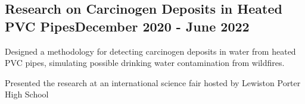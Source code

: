 \documentclass[a4paper, 12pt]{article}
\begin{document}
\vspace*{10pt}
\subsection {{Research on Carcinogen Deposits in Heated PVC Pipes}\hfill December 2020 - June 2022}
\begin{zitemize}
\item Designed a methodology for detecting carcinogen deposits in water from heated PVC pipes, simulating possible drinking water contamination from wildfires.  
\item Presented the research at an international science fair hosted by Lewiston Porter High School 
\end{zitemize}
\end{document}
